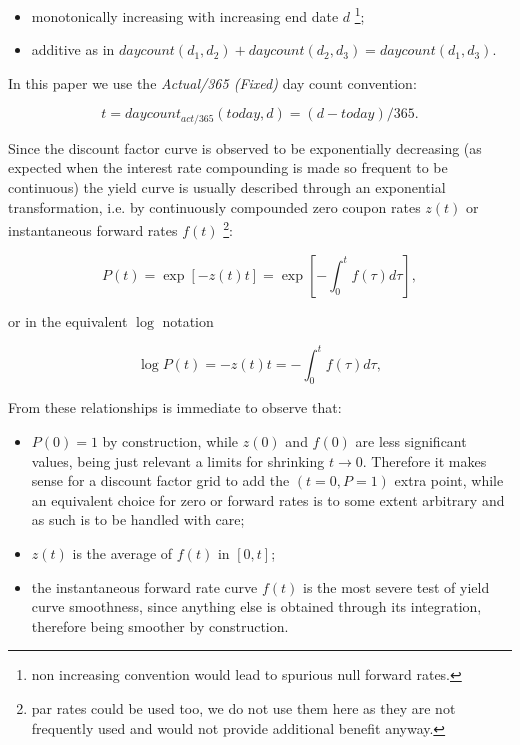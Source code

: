 \documentclass[11pt,reqno]{amsart}
\begin{document}
\begin{itemize}
\item monotonically increasing with increasing end date $d$ \footnote{non increasing convention would lead to spurious null forward rates.};

\item additive as in $daycount\left( d_{1},d_{2}\right) +daycount\left(
d_{2},d_{3}\right) =daycount\left( d_{1},d_{3}\right) $.
\end{itemize}

In this paper we use the \textit{Actual/365 (Fixed)} \cite{ISDA} day count convention:

\begin{equation*}
t=daycount_{act/365}\left( today,d\right) =\left( d-today\right) /365.
\end{equation*}

Since the discount factor curve is observed to be exponentially decreasing (as expected when the interest rate compounding is made so frequent to be continuous) the yield curve is usually described through an exponential transformation, i.e. by continuously compounded zero coupon rates $z(t)$ or instantaneous forward rates $f(t)$ \footnote{par rates could be used too, we do not use them here as they are not frequently used and would not provide additional benefit anyway.}:

\begin{equation}
P(t)=\exp \left[ -z\left( t\right) t\right] =\exp \left[ -\int_{0}^{t}f%
\left( \tau \right) d\tau \right] ,  \label{eqn:relationship}
\end{equation}

or in the equivalent $\log$ notation

\begin{equation}
\log P\left( t\right) =-z\left( t\right) t=-\int_{0}^{t}f(\tau )d\tau ,
\label{eqn:logrelationship}
\end{equation}

From these relationships is immediate to observe that:

\begin{itemize}
\item $P\left( 0\right) =1$ by construction, while $z\left( 0\right) $ and $f\left( 0\right) $ are less significant values, being just relevant a limits for shrinking $t\rightarrow 0$. Therefore it makes sense for a discount factor grid to add the $\left( t=0,P=1\right) $ extra point, while an equivalent choice for zero or forward rates is to some extent arbitrary and as such is to be handled with care;
\item $z\left( t\right) $ is the average of $f\left( t\right) $ in $\left[0,t\right] $;
\item the instantaneous forward rate curve $f\left( t\right) $ is the most severe test of yield curve smoothness, since anything else is obtained through its integration, therefore being smoother by construction.
\end{itemize}
\end{document}
